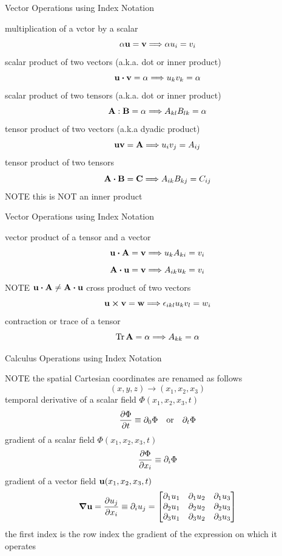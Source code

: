 \documentclass[9pt,mathserif]{beamer}
\let\emph\relax %
\begin{document}
\begin{frame}{Vector Operations using Index Notation}
	\begin{outline}
		\1 multiplication of a vctor by a scalar
		$$\alpha \vb{u} = \vb{v}\Longrightarrow \alpha u_i = v_i$$
		\1 scalar product of two vectors (a.k.a. dot or inner product)
		$$\vb{u}\vdot\vb{v} = \alpha \imp u_kv_k = \alpha$$
		\1 scalar product of two tensors (a.k.a. dot or inner product)
		$$\vb{A} :\vb{B}=\alpha \Longrightarrow A_{kl}B_{lk} =\alpha$$
		\1 tensor product of two vectors (a.k.a dyadic product)
		$$\vb{u}\vb{v}=\vb{A}\Longrightarrow u_iv_j =A_{ij}$$
		\1 tensor product of two tensors
		$$\vb{A}\vdot \vb{B} = \vb{C}\imp A_{ik}B_{kj} = C_{ij}$$
			\2 NOTE this is NOT an inner product
	\end{outline}
\end{frame}

\begin{frame}{Vector Operations using Index Notation}
	\begin{outline}
		\1 vector product of a tensor and a vector
		$$\vb{u}\vdot \vb{A}=\vb{v} \imp u_kA_{ki}=v_i$$
		$$\vb{A}\vdot \vb{u} = \vb{v} \imp A_{ik}u_k = v_i$$
			\2 NOTE $\vb{u}\vdot\vb{A}\neq \vb{A}\vdot\vb{u}$
		\1 cross product of two vectors
		$$\vb{u}\cp \vb{v} = \vb{w}\imp \oldeps_{ikl}u_kv_l = w_i$$
		\1 contraction or trace of a tensor
		$$\Tr \vb{A} = \alpha \Longrightarrow A_{kk} = \alpha$$
	\end{outline}
\end{frame}

\begin{frame}{Calculus Operations using Index Notation}
	\begin{outline}
		\1 NOTE the spatial Cartesian coordinates are renamed as follows
			$$(x,y,z)\to (x_1,x_2,x_3)$$
		\1 temporal derivative of a scalar field $\Phi(x_1,x_2,x_3,t)$
			$$\pdv{\Phi}{t}\equiv \partial_0\Phi \qor \partial_t\Phi$$
		\1 gradient of a scalar field $\Phi(x_1,x_2,x_3,t)$
			$$\pdv{\Phi}{x_i} \equiv \partial_i \Phi$$
		\1 gradient of a vector field $\vb{u}(x_1,x_2,x_3,t)$
		$$\grad \vb{u} = \pdv{u_j}{x_i}\equiv \partial_iu_j = \mqty[\partial_1u_1&\partial_1u_2&\partial_1u_3\\ \partial_2u_1&\partial_2u_2&\partial_2u_3\\ \partial_3u_1&\partial_3u_2&\partial_3u_3  ]$$
			\2 the first index is the row index
			\2 the gradient \emph{increases by one the rank} of the expression on which it operates
	\end{outline}
\end{frame}
\end{document}
